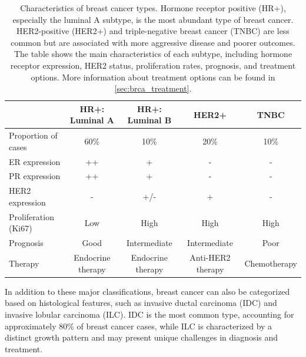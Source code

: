 \begin{table}[ht]
    \begin{tabular}{lcccc}
        \hline
                                  & HR+: Luminal A    & HR+: Luminal B
                                  &
        HER2+
                                  & TNBC
        \\ \hline
        Proportion of cases       & 60\%              & 10\%              &
        20\%
                                  & 10\%
        \\
        ER\textalpha{} expression & ++                & +
                                  & -
                                  & -
        \\
        PR expression             & ++                & +                 & -
                                  & -
        \\
        HER2 expression           & -                 & +/-               & +
                                  & -
        \\
        Proliferation (Ki67)      & Low               & High              &
        High
                                  & High
        \\
        Prognosis                 & Good              & Intermediate      &
        Intermediate
                                  & Poor
        \\
        Therapy                   & Endocrine therapy & Endocrine therapy &
        Anti-HER2
        therapy                   & Chemotherapy
        \\ \hline
    \end{tabular}
    \caption{Characteristics of breast cancer
        types\supercite{clusan_basic_2023}.
        Hormone receptor positive (HR+), especially the luminal A subtype, is the most
        abundant type of breast cancer.
        HER2-positive (HER2+) and triple-negative breast cancer (TNBC) are less common
        but are associated with more aggressive disease and poorer outcomes.
        The table shows the main characteristics of each subtype, including hormone
        receptor expression, HER2 status, proliferation rates, prognosis, and treatment
        options.
        More information about treatment options can be found in
        \cref{sec:brca_treatment}.
    }
    \label{tab:brca_subtypes}
\end{table}

In addition to these major classifications, breast cancer can also be
categorized based on histological features, such as invasive ductal carcinoma
(IDC) and invasive lobular carcinoma (ILC).
IDC is the most common type, accounting for approximately 80\% of breast cancer
cases, while ILC is characterized by a distinct growth pattern and may present
unique challenges in diagnosis and
treatment\supercite{mittal_molecular_nodate}.

